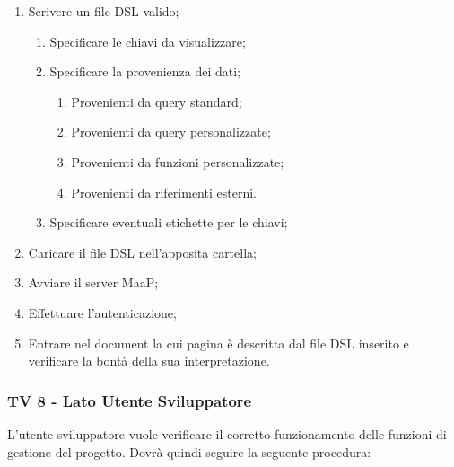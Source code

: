 \begin{enumerate}
\item Scrivere un file DSL valido;
\begin{enumerate}
\item Specificare le chiavi da visualizzare;
\item Specificare la provenienza dei dati;
\begin{enumerate}
\item Provenienti da query standard;
\item Provenienti da query personalizzate;
\item Provenienti da funzioni personalizzate;
\item Provenienti da riferimenti esterni.
\end{enumerate}
\item Specificare eventuali etichette per le chiavi;
\end{enumerate}
\item Caricare il file DSL nell'apposita cartella;
\item Avviare il server MaaP;
\item Effettuare l'autenticazione;
\item Entrare nel document la cui pagina è descritta dal file DSL inserito e verificare la bontà della sua interpretazione.
\end{enumerate}


\subsubsection{TV 8 - Lato Utente Sviluppatore}

L’utente sviluppatore vuole verificare il corretto funzionamento delle funzioni di gestione del progetto.
Dovrà quindi seguire la seguente procedura:

